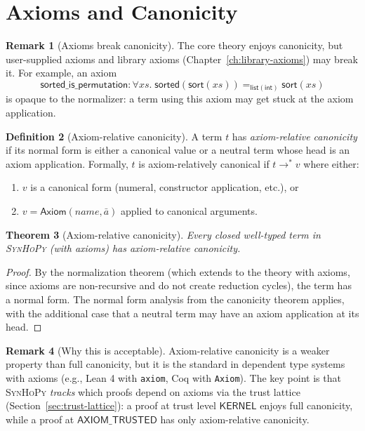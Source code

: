 \documentclass[11pt,a4paper]{report}
\theoremstyle{definition}
\newtheorem{definition}{Definition}[chapter]
\newtheorem{remark}[definition]{Remark}
\theoremstyle{plain}
\newtheorem{theorem}[definition]{Theorem}
\newcommand{\synhopy}{\textsc{SynHoPy}}
\begin{document}
\section{Axioms and Canonicity}

\begin{remark}[Axioms break canonicity]
The core theory enjoys canonicity, but user-supplied axioms and library axioms
(Chapter~\ref{ch:library-axioms}) may break it.  For example, an axiom
\[
  \mathsf{sorted\_is\_permutation} : \forall xs.\;
    \mathsf{sorted}(\mathsf{sort}(xs)) =_{\mathsf{list}(\mathsf{int})} \mathsf{sort}(xs)
\]
is opaque to the normalizer: a term using this axiom may get stuck at the axiom
application.
\end{remark}

\begin{definition}[Axiom-relative canonicity]
\label{def:axiom-rel-canon}
A term $t$ has \emph{axiom-relative canonicity} if its normal form is either
a canonical value or a neutral term whose head is an axiom application.
Formally, $t$ is axiom-relatively canonical if $t \to^* v$ where either:
\begin{enumerate}
  \item $v$ is a canonical form (numeral, constructor application, etc.), or
  \item $v = \mathsf{Axiom}(\mathit{name}, \bar{a})$ applied to canonical arguments.
\end{enumerate}
\end{definition}

\begin{theorem}[Axiom-relative canonicity]
Every closed well-typed term in \synhopy{} (with axioms) has axiom-relative
canonicity.
\end{theorem}
\begin{proof}
By the normalization theorem (which extends to the theory with axioms, since
axioms are non-recursive and do not create reduction cycles), the term has a
normal form.  The normal form analysis from the canonicity theorem applies,
with the additional case that a neutral term may have an axiom application at
its head.
\end{proof}

\begin{remark}[Why this is acceptable]
Axiom-relative canonicity is a weaker property than full canonicity, but it
is the standard in dependent type systems with axioms (e.g., Lean 4 with
\texttt{axiom}, Coq with \texttt{Axiom}).  The key point is that \synhopy{}
\emph{tracks} which proofs depend on axioms via the trust lattice
(Section~\ref{sec:trust-lattice}): a proof at trust level $\mathsf{KERNEL}$ enjoys
full canonicity, while a proof at $\mathsf{AXIOM\_TRUSTED}$ has only
axiom-relative canonicity.
\end{remark}
\end{document}
